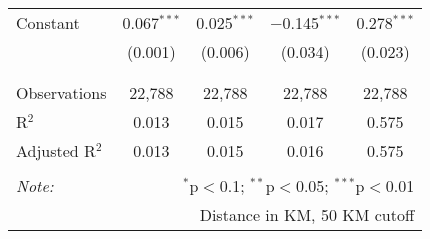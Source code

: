 \begin{table}[!htbp]
\begin{tabular}{@{\extracolsep{5pt}}lcccc}
 Constant & 0.067$^{***}$ & 0.025$^{***}$ & $-$0.145$^{***}$ & 0.278$^{***}$ \\ 
  & (0.001) & (0.006) & (0.034) & (0.023) \\ 
  & & & & \\ 
\hline \\[-1.8ex] 
Observations & 22,788 & 22,788 & 22,788 & 22,788 \\ 
R$^{2}$ & 0.013 & 0.015 & 0.017 & 0.575 \\ 
Adjusted R$^{2}$ & 0.013 & 0.015 & 0.016 & 0.575 \\ 
\hline 
\hline \\[-1.8ex] 
\textit{Note:}  & \multicolumn{4}{r}{$^{*}$p$<$0.1; $^{**}$p$<$0.05; $^{***}$p$<$0.01} \\ 
 & \multicolumn{4}{r}{Distance in KM, 50 KM cutoff} \\ 
\end{tabular} 
\end{table} 
